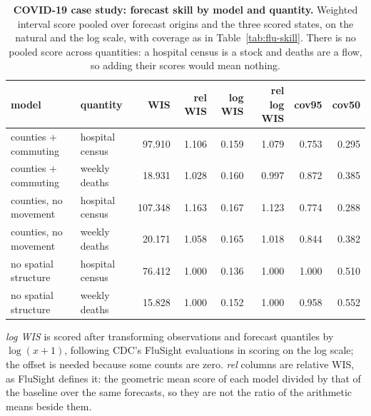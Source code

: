 \begin{table}[tb]
\centering
\caption{\textbf{COVID-19 case study: forecast skill by model and quantity.} Weighted interval score pooled over forecast origins and the three scored states, on the natural and the log scale, with coverage as in Table~\ref{tab:flu-skill}. There is no pooled score across quantities: a hospital census is a stock and deaths are a flow, so adding their scores would mean nothing.}
\label{tab:covid-skill}
\footnotesize
\setlength{\tabcolsep}{5pt}
\begin{tabular}{@{}llrrrrrr@{}}
\toprule
model & quantity & \textbf{WIS} & \textbf{rel WIS} & \textbf{log WIS} & \textbf{rel log WIS} & \textbf{cov95} & \textbf{cov50} \\
\midrule
counties + commuting & hospital census & 97.910 & 1.106 & 0.159 & 1.079 & 0.753 & 0.295 \\
counties + commuting & weekly deaths & 18.931 & 1.028 & 0.160 & 0.997 & 0.872 & 0.385 \\
counties, no movement & hospital census & 107.348 & 1.163 & 0.167 & 1.123 & 0.774 & 0.288 \\
counties, no movement & weekly deaths & 20.171 & 1.058 & 0.165 & 1.018 & 0.844 & 0.382 \\
no spatial structure & hospital census & 76.412 & 1.000 & 0.136 & 1.000 & 1.000 & 0.510 \\
no spatial structure & weekly deaths & 15.828 & 1.000 & 0.152 & 1.000 & 0.958 & 0.552 \\
\bottomrule
\end{tabular}
\par\medskip\raggedright\scriptsize \emph{log WIS} is scored after transforming observations and forecast quantiles by $\log(x+1)$, following CDC's FluSight evaluations in scoring on the log scale; the offset is needed because some counts are zero. \emph{rel} columns are relative WIS, as FluSight defines it: the geometric mean score of each model divided by that of the baseline over the same forecasts, so they are not the ratio of the arithmetic means beside them.
\end{table}
